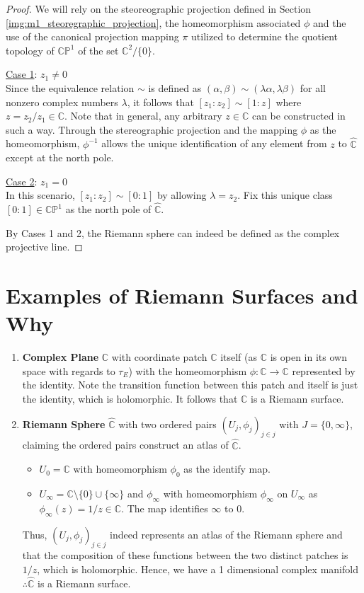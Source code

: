 \documentclass{article}
\theoremstyle{definition}
\newcommand{\CC}{\mathbb{C}}
\newcommand{\PP}{\mathbb{P}}
\newcommand{\union}{\cup}
\begin{document}
\begin{proof}
We will rely on the steoreographic projection defined in Section \ref{img:m1_steoregraphic_projection}, the homeomorphism associated $\phi$ and the use of the canonical projection mapping $\pi$ utilized to determine the quotient topology of $\CC\PP^{1}$ of the set $\CC^{2}/\{0\}$.

\underline{Case 1}: $z_{1} \ne 0$\\
Since the equivalence relation $\sim$ is defined as $(\alpha, \beta) \sim (\lambda\alpha, \lambda\beta)$ for all nonzero complex numbers $\lambda$, it follows that $[z_{1}:z_{2}] \sim [1:z]$ where $z = z_{2}/z_{1} \in \CC$. Note that in general, any arbitrary $z \in \CC$ can be constructed in such a way. Through the stereographic projection and the mapping $\phi$ as the homeomorphism, $\phi^{-1}$ allows the unique identification of any element from $z$ to $\hat{\CC}$ except at the north pole.

\underline{Case 2}: $z_{1} = 0$\\
In this scenario, $[z_{1}:z_{2}] \sim [0:1]$ by allowing $\lambda = z_{2}$. Fix this unique class $[0:1] \in \CC\PP^{1}$ as the north pole of $\hat{\CC}$. 

By Cases 1 and 2, the Riemann sphere can indeed be defined as the complex projective line.
\end{proof}

\section{Examples of Riemann Surfaces and Why}
\begin{enumerate}
    \item \textbf{Complex Plane} $\CC$ with coordinate patch $\CC$ itself (as $\CC$ is open in its own space with regards to $\tau_{E}$) with the homeomorphism $\phi: \CC \to \CC$ represented by the identity. Note the transition function between this patch and itself is just the identity, which is holomorphic. It follows that $\CC$ is a Riemann surface.
    \item \textbf{Riemann Sphere} $\hat{\CC}$ with two ordered pairs $(U_{j}, \phi_{j})_{j\in j}$ with $J=\{0, \infty\}$, claiming the ordered pairs construct an atlas of $\hat{\CC}$.
    \begin{itemize}
        \item $U_{0} = \CC$ with homeomorphism $\phi_{0}$ as the identify map.
        \item $U_{\infty} = \CC\text{\textbackslash}\{0\} \union \{\infty\}$ and $\phi_{\infty}$ with homeomorphism $\phi_{\infty}$ on $U_{\infty}$ as $\phi_{\infty}(z)=1/z \in \CC$. The map identifies $\infty$ to $0$.
    \end{itemize}
    
    Thus, $(U_{j}, \phi_{j})_{j\in j}$ indeed represents an atlas of the Riemann sphere and that the composition of these functions between the two distinct patches is $1/z$, which is holomorphic. Hence, we have a 1 dimensional complex manifold $\therefore \hat{\CC}$ is a Riemann surface.
        
\end{enumerate}
\end{document}
